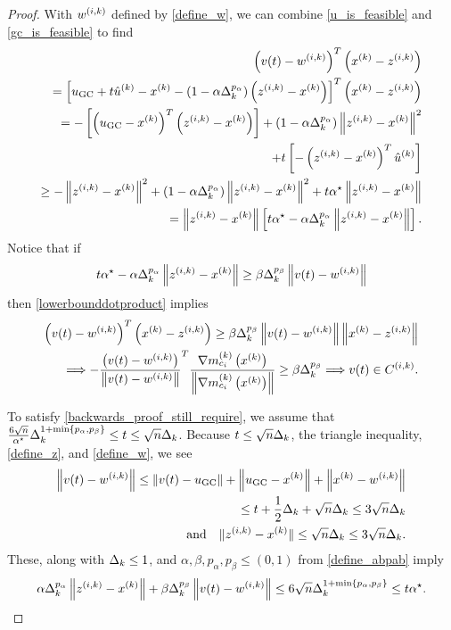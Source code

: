 \begin{proof}
With ${w^{(i, k)}}$ defined by \cref{define_w}, we can combine \cref{u_is_feasible} and \cref{gc_is_feasible} to find
\begin{align}
\left(v(t) - {w^{(i, k)}} \right)^T\left(x^{(k)} - {z^{(i, k)}} \right) \nonumber \\
=\left[ u_{\textrm{GC}} + t{{\hat u}^{(k)}} - x^{(k)} - \left(1 - \alpha\Delta_k^{p_{\alpha}}\right)\left({z^{(i, k)}} - x^{(k)}\right) \right]^T\left(x^{(k)} - {z^{(i, k)}} \right) \nonumber \\
=- \left[
\left( u_{\textrm{GC}} - x^{(k)}\right)^T\left({z^{(i, k)}} - x^{(k)} \right)
\right]
+\left(1 - \alpha\Delta_k^{p_{\alpha}}\right)\left\|{z^{(i, k)}} - x^{(k)}\right\|^2 \nonumber \\
+ t\left[ -\left({z^{(i, k)}} - x^{(k)}\right)^T{{\hat u}^{(k)}}\right] \nonumber \\
\ge 
-\left\|{z^{(i, k)}} - x^{(k)}\right\|^2
+\left(1 - \alpha\Delta_k^{p_{\alpha}}\right)\left\|{z^{(i, k)}} - x^{(k)}\right\|^2
+ t{ \alpha^{\star} } \left\|{z^{(i, k)}} - x^{(k)}\right\| \nonumber \\
= \left\|{z^{(i, k)}} - x^{(k)}\right\|
\left[
t{ \alpha^{\star} }
- \alpha\Delta_k^{p_{\alpha}} \left\|{z^{(i, k)}} - x^{(k)}\right\|
\right]. \label{lowerbounddotproduct}
\end{align}
Notice that if
\begin{align}
t{ \alpha^{\star} } - \alpha\Delta_k^{p_{\alpha}} \left\|{z^{(i, k)}} - x^{(k)}\right\| \ge \beta \Delta_k^{p_{\beta}} \left\|v(t) - {w^{(i, k)}}\right\| \label{backwards_proof_still_require}
\end{align}
then \cref{lowerbounddotproduct} implies
\begin{align*}
\left(v(t) - {w^{(i, k)}} \right)^T\left(x^{(k)} - {z^{(i, k)}} \right) \ge \beta \Delta_k^{p_{\beta}}\left\|v(t) - {w^{(i, k)}}\right\| \left\|x^{(k)} - {z^{(i, k)}}\right\| \\
\Longrightarrow -\frac {\left(v(t) - {w^{(i, k)}} \right)}{\left\|v(t) - {w^{(i, k)}} \right\|}^T\frac{{\nabla m_{c_i}^{(k)}\left(x^{(k)}\right)}}{\left\|{\nabla m_{c_i}^{(k)}\left(x^{(k)}\right)}\right\|}\ge\beta \Delta_k^{p_{\beta}} 
\Longrightarrow v(t) \in {C^{(i, k)}}.
\end{align*}

To satisfy \cref{backwards_proof_still_require}, we assume that 
$\frac{6 \sqrt{n}}{{ \alpha^{\star} }} \Delta_k^{1 + \min\left\{p_{\alpha}, p_{\beta}\right\}} \le t \le \sqrt{n}\Delta_k$.
Because $t \le \sqrt{n} \Delta_k$, the triangle inequality, \cref{define_z}, and \cref{define_w}, we see
\begin{align*}
\left\|v(t) - {w^{(i, k)}}\right\| \le \left\|v(t) - u_{\textrm{GC}}\right\| + \left\|u_{\textrm{GC}} - x^{(k)} \right\| + \left\|x^{(k)} - {w^{(i, k)}}\right\| \\
\le t + \frac 1 2 \Delta_k + \sqrt{n}\Delta_k 
\le 3\sqrt{n}\Delta_k  \\
\textrm{and} \quad \|{z^{(i, k)}} - x^{(k)} \| \le \sqrt{n}\Delta_k \le 3\sqrt{n}\Delta_k.
\end{align*}
These, along with $\Delta_k \le 1$, and $\alpha, \beta, p_{\alpha}, p_{\beta} \le (0, 1)$ from \cref{define_abpab} imply
\begin{align*}
\alpha\Delta_k^{p_{\alpha}} \left\|{z^{(i, k)}} - x^{(k)}\right\| + \beta \Delta_k^{p_{\beta}} \left\|v(t) - {w^{(i, k)}}\right\| 
\le 6 \sqrt{n} \Delta_k^{1 + \min\left\{p_{\alpha}, p_{\beta}\right\}} \le t { \alpha^{\star} }.
\end{align*}


\end{proof}
